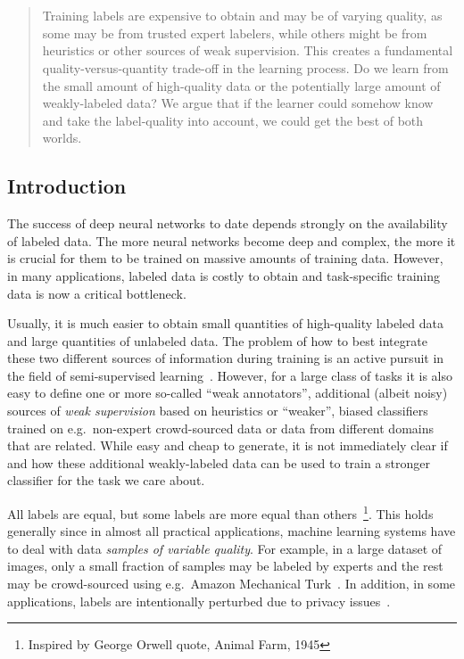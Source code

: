 \chapter{}
\label{chap:5}
%
\begin{quote}
Training labels are expensive to obtain and may be of varying quality, as some may be from trusted expert labelers, while others might be from heuristics or other sources of weak supervision. This creates a fundamental quality-versus-quantity trade-off in the learning process.  Do we learn from the small amount of high-quality data or the potentially large amount of weakly-labeled data? We argue that if the learner could somehow know and take the label-quality into account, we could get the best of both worlds.
\end{quote}
%
\section{Introduction}
The success of deep neural networks to date depends strongly on the availability of labeled data. The more neural networks become deep and complex, the more it is crucial for them to be trained on massive amounts of training data. However, in many applications, labeled data is costly to obtain and task-specific training data is now a critical bottleneck. 

Usually, it is much easier to obtain small quantities of high-quality labeled data and large quantities of unlabeled data. The problem of how to best integrate these two different sources of information during training is an active pursuit in the field of semi-supervised learning~\citep{chap:semi06}.
However, for a large class of tasks it is also easy to define one or more so-called ``weak annotators'', additional (albeit noisy) sources of \emph{weak supervision} based on heuristics or ``weaker'', biased classifiers trained on e.g.\ non-expert crowd-sourced data or data from different domains that are related. 
While easy and cheap to generate, it is not immediately clear if and how these additional weakly-labeled data can be used to train a stronger classifier for the task we care about.

All labels are equal, but some labels are more equal than others~\footnote{Inspired by George Orwell quote, Animal Farm, 1945}. This holds generally since in almost all practical applications, machine learning systems have to deal with data \emph{samples of variable quality}. For example, in a large dataset of images, only a small fraction of samples may be labeled by experts and the rest may be crowd-sourced using e.g.\ Amazon Mechanical Turk~\citep{Veit:2017}. In addition, in some applications, labels are intentionally perturbed due to privacy issues~\citep{wainwright2012privacy,Papernot:2016, dehghani:2017:neuir}. 

